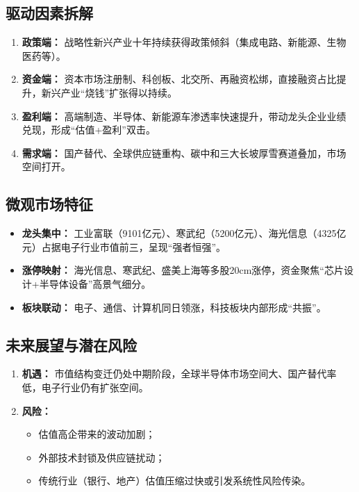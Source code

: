 \subsection{驱动因素拆解}
\begin{enumerate}[leftmargin=*, nosep]
  \item \textbf{政策端：}  
    战略性新兴产业十年持续获得政策倾斜（集成电路、新能源、生物医药等）。
  \item \textbf{资金端：}  
    资本市场注册制、科创板、北交所、再融资松绑，直接融资占比提升，新兴产业“烧钱”扩张得以持续。
  \item \textbf{盈利端：}  
    高端制造、半导体、新能源车渗透率快速提升，带动龙头企业业绩兑现，形成“估值+盈利”双击。
  \item \textbf{需求端：}  
    国产替代、全球供应链重构、碳中和三大长坡厚雪赛道叠加，市场空间打开。
\end{enumerate}

\subsection{微观市场特征}
\begin{itemize}
  \item \textbf{龙头集中：}  
    工业富联（9101亿元）、寒武纪（5200亿元）、海光信息（4325亿元）占据电子行业市值前三，呈现“强者恒强”。
  \item \textbf{涨停映射：}  
    海光信息、寒武纪、盛美上海等多股20cm涨停，资金聚焦“芯片设计+半导体设备”高景气细分。
  \item \textbf{板块联动：}  
    电子、通信、计算机同日领涨，科技板块内部形成“共振”。
\end{itemize}

\subsection{未来展望与潜在风险}
\begin{enumerate}[leftmargin=*, nosep]
  \item \textbf{机遇：}  
    市值结构变迁仍处中期阶段，全球半导体市场空间大、国产替代率低，电子行业仍有扩张空间。
  \item \textbf{风险：}  
    \begin{itemize}[nosep]
      \item 估值高企带来的波动加剧；
      \item 外部技术封锁及供应链扰动；
      \item 传统行业（银行、地产）估值压缩过快或引发系统性风险传染。
    \end{itemize}
\end{enumerate}

